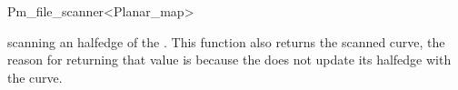 \begin{ccRefClass}{Pm_file_scanner<Planar_map>}

{scanning an halfedge of the . This function also returns the scanned curve, the reason for returning that value is because the  does not update its halfedge with the curve.}


\end{ccRefClass} %

\ccRefPageEnd











